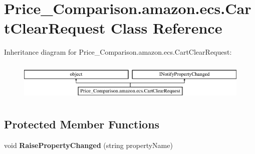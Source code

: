 \hypertarget{class_price___comparison_1_1amazon_1_1ecs_1_1_cart_clear_request}{\section{Price\-\_\-\-Comparison.\-amazon.\-ecs.\-Cart\-Clear\-Request Class Reference}
\label{class_price___comparison_1_1amazon_1_1ecs_1_1_cart_clear_request}
}


 


Inheritance diagram for Price\-\_\-\-Comparison.\-amazon.\-ecs.\-Cart\-Clear\-Request\-:\begin{figure}[H]
\begin{center}
\leavevmode
\includegraphics[height=1.879195cm]{class_price___comparison_1_1amazon_1_1ecs_1_1_cart_clear_request}
\end{center}
\end{figure}
\subsection*{Protected Member Functions}
\begin{DoxyCompactItemize}
\item 
\hypertarget{class_price___comparison_1_1amazon_1_1ecs_1_1_cart_clear_request_a57757fbae5955bbfe7277170c27ace83}{void {\bfseries Raise\-Property\-Changed} (string property\-Name)}\label{class_price___comparison_1_1amazon_1_1ecs_1_1_cart_clear_request_a57757fbae5955bbfe7277170c27ace83}

\end{DoxyCompactItemize}
